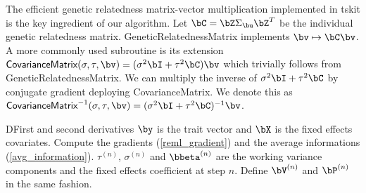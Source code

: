The efficient genetic relatedness matrix-vector multiplication implemented in \textsf{tskit} is the key ingredient of our algorithm.
Let $\bC = \bZ \Sigma_\bu \bZ^T$ be the individual genetic relatedness matrix.
\textsf{GeneticRelatednessMatrix} implements $\bv \mapsto \bC\bv$.
A more commonly used subroutine is its extension 
$\textsf{CovarianceMatrix}(\sigma, \tau, \bv) = (\sigma^2 \bI + \tau^2 \bC ) \bv$ which trivially follows from \textsf{GeneticRelatednessMatrix}.
We can multiply the inverse of $\sigma^2 \bI + \tau^2 \bC $ by conjugate gradient deploying \textsf{CovarianceMatrix}.
We denote this as $\textsf{CovarianceMatrix}^{-1}(\sigma, \tau, \bv) = (\sigma^2 \bI + \tau^2 \bC)^{-1} \bv$.

\begin{taocpalg}{D}{First and second derivatives} \label{algo:D}
{
    $\by$ is the trait vector and $\bX$ is the fixed effects covariates.
    Compute the gradients (\ref{reml_gradient}) and the average informations (\ref{avg_information}).
    $\tau^{(n)}$, $\sigma^{(n)}$ and $\bbeta^{(n)}$ are the working variance components and the fixed effects coefficient at step $n$.
    Define $\bV^{(n)}$ and $\bP^{(n)}$ in the same fashion.
}





\end{taocpalg}

